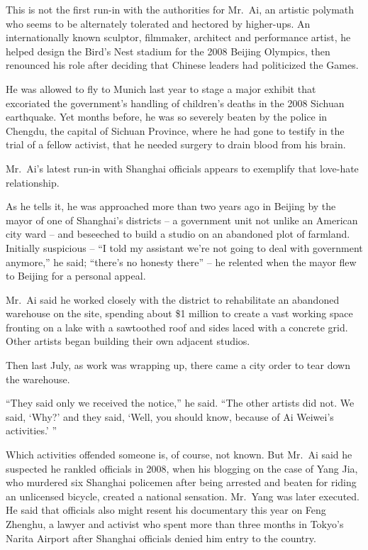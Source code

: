 ﻿\documentclass[12pt]{article}
\begin{document}
This is not the first run-in with the authorities for Mr.~Ai, an artistic polymath who seems to be
alternately tolerated and hectored by higher-ups. An internationally known sculptor, filmmaker,
architect and performance artist, he helped design the Bird's Nest stadium for the 2008 Beijing
Olympics, then renounced his role after deciding that Chinese leaders had politicized the Games.

He was allowed to fly to Munich last year to stage a major exhibit that excoriated the government's
handling of children's deaths in the 2008 Sichuan earthquake. Yet months before, he was so severely
beaten by the police in Chengdu, the capital of Sichuan Province, where he had gone to testify in
the trial of a fellow activist, that he needed surgery to drain blood from his brain.

Mr.~Ai's latest run-in with Shanghai officials appears to exemplify that love-hate relationship.

As he tells it, he was approached more than two years ago in Beijing by the mayor of one of
Shanghai's districts -- a government unit not unlike an American city ward -- and beseeched to build
a studio on an abandoned plot of farmland. Initially suspicious -- ``I told my assistant we're not
going to deal with government anymore,'' he said; ``there's no honesty there'' -- he relented when
the mayor flew to Beijing for a personal appeal.

Mr.~Ai said he worked closely with the district to rehabilitate an abandoned warehouse on the site,
spending about \$1 million to create a vast working space fronting on a lake with a sawtoothed roof
and sides laced with a concrete grid. Other artists began building their own adjacent studios.

Then last July, as work was wrapping up, there came a city order to tear down the warehouse.

``They said only we received the notice,'' he said. ``The other artists did not. We said, `Why?' and
they said, `Well, you should know, because of Ai Weiwei's activities.' ''

Which activities offended someone is, of course, not known. But Mr.~Ai said he suspected he rankled
officials in 2008, when his blogging on the case of Yang Jia, who murdered six Shanghai policemen
after being arrested and beaten for riding an unlicensed bicycle, created a national sensation.
Mr.~Yang was later executed. He said that officials also might resent his documentary this year on
Feng Zhenghu, a lawyer and activist who spent more than three months in Tokyo's Narita Airport after
Shanghai officials denied him entry to the country.
\end{document}
